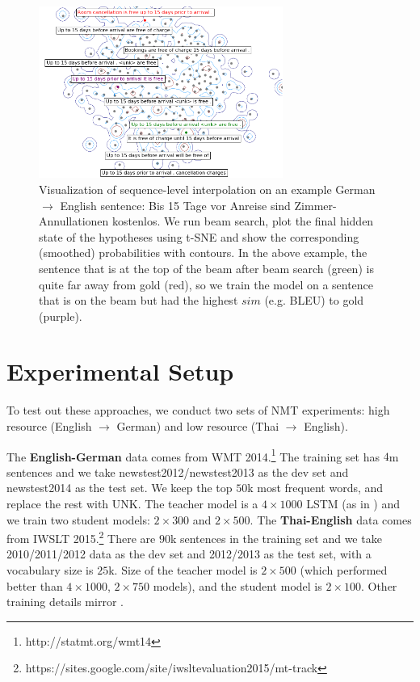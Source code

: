 \documentclass[11pt,letterpaper]{article}
\begin{document}
\begin{figure}[t]\label{fig2}
\centering
\includegraphics[width=8cm]{mapcrop}
\caption{Visualization of sequence-level interpolation on an example 
German $\rightarrow$ English sentence:
\textsf{Bis 15 Tage vor Anreise sind Zimmer-Annullationen kostenlos}.
We run beam search, plot the final hidden state
of the hypotheses using t-SNE %
and show the corresponding (smoothed)
probabilities with contours. 
In the above example, the sentence that is at the top of the beam after beam search 
(green) is quite far away from gold (red), so we train the model on a sentence
that is on the beam but had the highest $sim$ (e.g. BLEU) to gold (purple).}
\end{figure}


\section{Experimental Setup}
To test out these approaches, 
we conduct two sets of NMT experiments:  high resource (English $\rightarrow$ German) and low resource
(Thai $\rightarrow$ English).

The \textbf{English-German} data comes from WMT 2014.\footnote{http://statmt.org/wmt14}
The training set has $4$m sentences and we take  newstest2012/newstest2013
as the dev set and newstest2014 as the test set. We keep the top $50$k most
frequent words, and replace the rest with UNK. The teacher model
is a $4 \times 1000$ LSTM (as in ) and we train two student models:
$2 \times 300$ and $2 \times 500$.
The \textbf{Thai-English} data comes from IWSLT 2015.\footnote{https://sites.google.com/site/iwsltevaluation2015/mt-track}
There are $90$k sentences in the training set and we take 2010/2011/2012 data as the dev set and
2012/2013 as the test set, with a vocabulary size is $25$k. Size of the teacher model is $2 \times 500$ 
(which performed better than $4 \times 1000$, $2 \times 750$ models), and the student model is $2 \times 100$. 
Other training details mirror .
\end{document}
